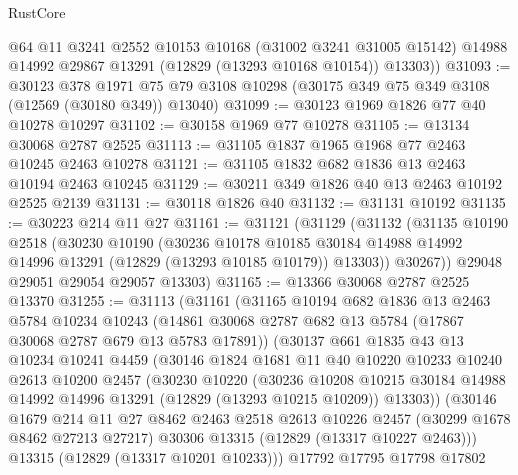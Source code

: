 \begin{lexlean}{RustCore}
\begin{coremodule}
        @64
        @11
        @3241
        @2552
        @10153
        @10168
        (@31002 @3241 @31005 @15142)
        @14988
        @14992
        @29867
        @13291
        (@12829 (@13293 @10168 @10154))
        @13303))
@31093 := @30123
    @378
    @1971
    @75
    @79
    @3108
    @10298
    (@30175 @349 @75 @349 @3108 (@12569 (@30180 @349)) @13040)
@31099 := @30123 @1969 @1826 @77 @40 @10278 @10297
@31102 := @30158 @1969 @77 @10278
@31105 := @13134 @30068 @2787 @2525
@31113 := @31105 @1837 @1965 @1968 @77 @2463 @10245 @2463 @10278
@31121 := @31105 @1832 @682 @1836 @13 @2463 @10194 @2463 @10245
@31129 := @30211 @349 @1826 @40 @13 @2463 @10192 @2525 @2139
@31131 := @30118 @1826 @40
@31132 := @31131 @10192
@31135 := @30223 @214 @11 @27
@31161 := @31121
    (@31129
      (@31132
        (@31135
          @10190
          @2518
          (@30230
            @10190
            (@30236
              @10178
              @10185
              @30184
              @14988
              @14992
              @14996
              @13291
              (@12829 (@13293 @10185 @10179))
              @13303))
          @30267))
      @29048
      @29051
      @29054
      @29057
      @13303)
@31165 := @13366 @30068 @2787 @2525 @13370
@31255 := @31113
    (@31161
      (@31165
        @10194
        @682
        @1836
        @13
        @2463
        @5784
        @10234
        @10243
        (@14861 @30068 @2787 @682 @13 @5784 (@17867 @30068 @2787 @679 @13 @5783 @17891))
        (@30137
          @661
          @1835
          @43
          @13
          @10234
          @10241
          @4459
          (@30146
            @1824
            @1681
            @11
            @40
            @10220
            @10233
            @10240
            @2613
            @10200
            @2457
            (@30230
              @10220
              (@30236
                @10208
                @10215
                @30184
                @14988
                @14992
                @14996
                @13291
                (@12829 (@13293 @10215 @10209))
                @13303))
            (@30146
              @1679
              @214
              @11
              @27
              @8462
              @2463
              @2518
              @2613
              @10226
              @2457
              (@30299 @1678 @8462 @27213 @27217)
              @30306
              @13315
              (@12829 (@13317 @10227 @2463)))
            @13315
            (@12829 (@13317 @10201 @10233)))
          @17792
          @17795
          @17798
          @17802

\end{coremodule}
\end{lexlean}
